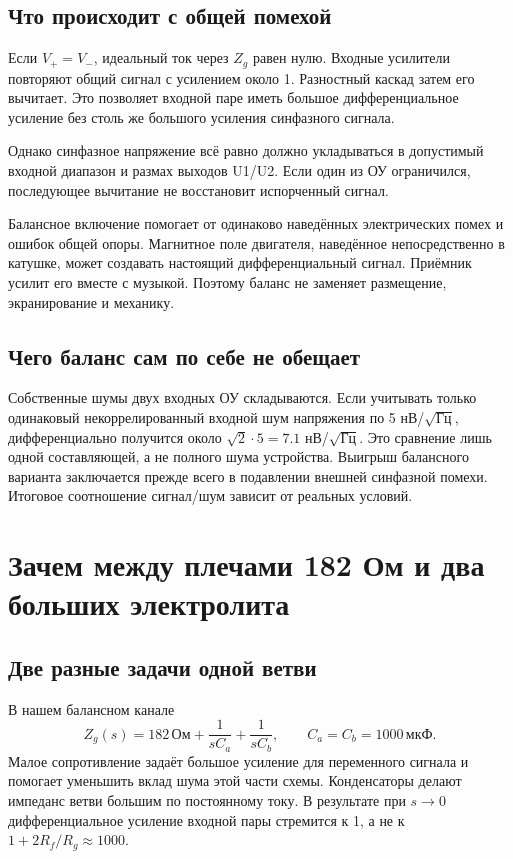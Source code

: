 \documentclass[a4paper,11pt]{article}
\newcommand{\Ohm}{\,\text{Ом}}
\newcommand{\uF}{\,\text{мкФ}}
\begin{document}
\subsection{Что происходит с общей помехой}

Если $V_+=V_-$, идеальный ток через $Z_g$ равен нулю.
Входные усилители повторяют общий сигнал с усилением около 1.
Разностный каскад затем его вычитает. Это позволяет входной паре иметь
большое дифференциальное усиление без столь же большого усиления синфазного сигнала.

Однако синфазное напряжение всё равно должно укладываться в допустимый входной
диапазон и размах выходов U1/U2. Если один из ОУ ограничился, последующее
вычитание не восстановит испорченный сигнал.

Балансное включение помогает от одинаково наведённых электрических помех и
ошибок общей опоры. Магнитное поле двигателя, наведённое непосредственно в
катушке, может создавать настоящий дифференциальный сигнал. Приёмник усилит его
вместе с музыкой. Поэтому баланс не заменяет размещение, экранирование и механику.

\subsection{Чего баланс сам по себе не обещает}

Собственные шумы двух входных ОУ складываются. Если учитывать только одинаковый
некоррелированный входной шум напряжения по 5 нВ/$\sqrt{\text{Гц}}$,
дифференциально получится около $\sqrt2\cdot5=7.1$ нВ/$\sqrt{\text{Гц}}$.
Это сравнение лишь одной составляющей, а не полного шума устройства.
Выигрыш балансного варианта заключается прежде всего в подавлении внешней
синфазной помехи. Итоговое соотношение сигнал/шум зависит от реальных условий.

\section{Зачем между плечами 182 Ом и два больших электролита}

\subsection{Две разные задачи одной ветви}

В нашем балансном канале
\[
 Z_g(s)=182\Ohm+\frac1{sC_a}+\frac1{sC_b},\qquad C_a=C_b=1000\uF.
\]
Малое сопротивление задаёт большое усиление для переменного сигнала и помогает
уменьшить вклад шума этой части схемы. Конденсаторы делают импеданс ветви
большим по постоянному току. В результате при $s\to0$ дифференциальное усиление
входной пары стремится к 1, а не к $1+2R_f/R_g\approx1000$.
\end{document}
